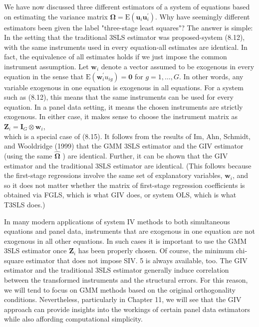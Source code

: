 \documentclass[10pt]{article}
\begin{document}
We have now discussed three different estimators of a system of equations based on estimating the variance matrix $\boldsymbol{\Omega}=\mathrm{E}\left(\mathbf{u}_{i} \mathbf{u}_{i}^{\prime}\right)$. Why have seemingly different estimators been given the label "three-stage least squares"? The answer is simple: In the setting that the traditional 3SLS estimator was proposed-system (8.12), with the same instruments used in every equation-all estimates are identical. In fact, the equivalence of all estimates holds if we just impose the common instrument assumption. Let $\mathbf{w}_{i}$ denote a vector assumed to be exogenous in every equation in the sense that $\mathrm{E}\left(\mathbf{w}_{i}^{\prime} u_{i g}\right)=\mathbf{0}$ for $g=1, \ldots, G$. In other words, any variable exogenous in one equation is exogenous in all equations. For a system such as (8.12), this means that the same instruments can be used for every equation. In a panel data setting, it means the chosen instruments are strictly exogenous. In either case, it makes sense to choose the instrument matrix as\\
$\mathbf{Z}_{i}=\mathbf{I}_{G} \otimes \mathbf{w}_{i}$,\\
which is a special case of (8.15). It follows from the results of Im, Ahn, Schmidt, and Wooldridge (1999) that the GMM 3SLS estimator and the GIV estimator (using the same $\hat{\boldsymbol{\Omega}}$ ) are identical. Further, it can be shown that the GIV estimator and the traditional 3SLS estimator are identical. (This follows because the first-stage regressions involve the same set of explanatory variables, $\mathbf{w}_{i}$, and so it does not matter whether the matrix of first-stage regression coefficients is obtained via FGLS, which is what GIV does, or system OLS, which is what T3SLS does.)

In many modern applications of system IV methods to both simultaneous equations and panel data, instruments that are exogenous in one equation are not exogenous in all other equations. In such cases it is important to use the GMM 3SLS estimator once $\mathbf{Z}_{i}$ has been properly chosen. Of course, the minimum chi-square estimator that does not impose SIV. 5 is always available, too. The GIV estimator and the traditional 3SLS estimator generally induce correlation between the transformed instruments and the structural errors. For this reason, we will tend to focus on GMM methods based on the original orthogonality conditions. Nevertheless, particularly in Chapter 11, we will see that the GIV approach can provide insights into the workings of certain panel data estimators while also affording computational simplicity.
\end{document}
